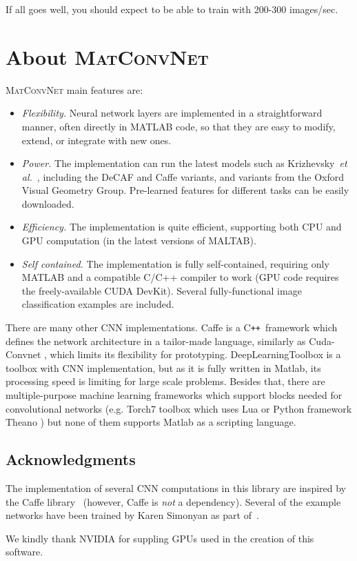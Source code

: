 \documentclass[12pt]{article}
\newcommand{\vlnn}{\textsc{MatConvNet}\xspace}
\newcommand{\cpp}{C{}\texttt{++}~}
\begin{document}
If all goes well, you should expect to be able to train with 200-300 images/sec.

\section{About \vlnn}

\vlnn main features are:
\begin{itemize}
\item \emph{Flexibility.} Neural network layers are implemented in a straightforward manner, often directly in MATLAB code, so that they are easy to modify, extend, or integrate with new ones.
\item \emph{Power.} The implementation can run the latest models such as Krizhevsky~\textit{et al.}~\cite{krizhevsky12imagenet}, including the DeCAF and Caffe variants, and variants from the Oxford Visual Geometry Group. Pre-learned features for different tasks can be easily downloaded.
\item \emph{Efficiency.} The implementation is quite efficient, supporting both CPU and GPU computation (in the latest versions of MALTAB).
\item \emph{Self contained.} The implementation is fully self-contained, requiring only MATLAB and a compatible C/C++ compiler to work (GPU code requires the freely-available CUDA DevKit). Several fully-functional image classification examples are included.\end{itemize}


There are many other CNN implementations. Caffe is a \cpp framework which defines the network architecture in a tailor-made language, similarly as Cuda-Convnet \cite{krizhevsky12imagenet}, which limits its flexibility for prototyping. DeepLearningToolbox \cite{deepltbx12} is a toolbox with CNN implementation, but as it is fully written in Matlab, its processing speed is limiting for large scale problems. Besides that, there are multiple-purpose machine learning frameworks which support blocks needed for convolutional networks (e.g. Torch7 toolbox \cite{collobert2011torch7} which uses Lua or Python framework Theano \cite{bergstra2010}) but none of them supports Matlab as a scripting language.

\subsection{Acknowledgments}\label{s:ack}

The implementation of several CNN computations in this library are inspired by the Caffe library~\cite{jia13caffe} (however, Caffe is \emph{not} a dependency). Several of the example networks have been trained by Karen Simonyan as part of~\cite{chatfield14return}.

We kindly thank NVIDIA for suppling GPUs used in the creation of this software.



\end{document}
